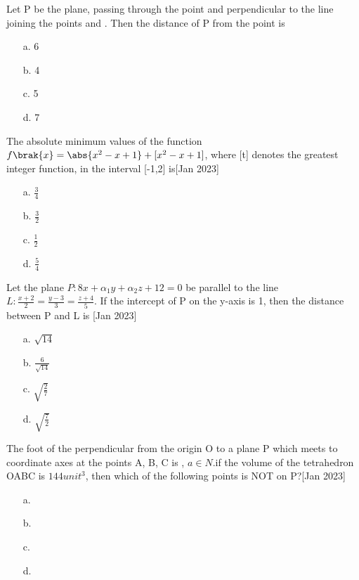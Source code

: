 \item Let P be the plane, passing through the point  and perpendicular to the line joining the points  and . Then the distance of P from the point  is
\begin{enumerate}
     \item [a.] 6
    \item [b.] 4
    \item [c.] 5
    \item [d.] 7
\end{enumerate}
\item The absolute minimum values of the function $f\brak{x}=\abs{x^2-x+1}+[x^2-x+1]$, where [t] denotes the greatest integer function, in the interval [-1,2] is\hfill  [Jan 2023]
\begin{enumerate}
     \item [a.] $\frac{3}{4}$
    \item [b.] $\frac{3}{2}$
    \item [c.] $\frac{1}{2}$
    \item [d.] $\frac{5}{4}$
\end{enumerate}
\item Let the plane $P:8x+\alpha _1y+\alpha _2z+12=0$ be parallel to the line $L:\frac{x+2}{2}=\frac{y-3}{3}=\frac{z+4}{5}$. If the intercept of P on the y-axis is 1, then the distance between P and L is \hfill  [Jan 2023]
\begin{enumerate}
\item [a.] $\sqrt{14}$
    \item [b.]$\frac{6}{\sqrt{14}}$
    \item [c.] $\sqrt{\frac{2}{7}}$
    \item [d.] $\sqrt{\frac{7}{2}}$
\end{enumerate}
\item The foot of the perpendicular from the origin O to a plane P which meets to coordinate axes at the points A, B, C
is ,  $a\in N$.if the volume of the tetrahedron OABC is $144 unit^3$, then which of the following points is NOT on P?\hfill  [Jan 2023]
\begin{enumerate}
\item [a.] 
    \item [b.] 
    \item [c.] 
    \item [d.] 
\end{enumerate}

